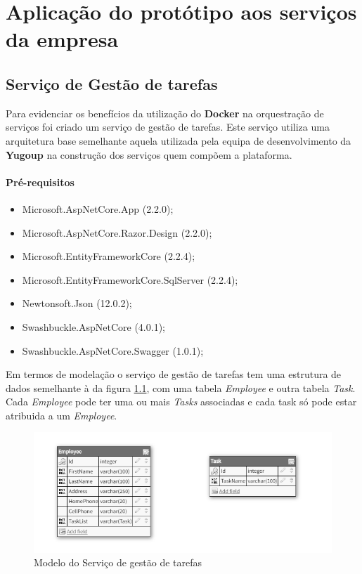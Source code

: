 \chapter[Aplicação do protótipo aos serviços da empresa]{Aplicação do protótipo aos serviços da empresa}
\label{Ch:ServicoExemplo}
\section{Serviço de Gestão de tarefas}

\hspace{1cm}Para evidenciar os benefícios da utilização do \textbf{Docker} na orquestração de serviços foi criado um serviço de gestão de tarefas. Este serviço utiliza uma arquitetura base semelhante aquela utilizada pela equipa de desenvolvimento da \textbf{Yugoup} na construção dos serviços quem compõem a plataforma.

\subsubsection{Pré-requisitos}

\begin{itemize}
 \item Microsoft.AspNetCore.App (2.2.0);
 \item Microsoft.AspNetCore.Razor.Design (2.2.0);
 \item Microsoft.EntityFrameworkCore (2.2.4);
 \item Microsoft.EntityFrameworkCore.SqlServer (2.2.4);
 \item Newtonsoft.Json (12.0.2);
 \item Swashbuckle.AspNetCore (4.0.1);
 \item Swashbuckle.AspNetCore.Swagger (1.0.1);
\end{itemize}

\hspace{1cm}Em termos de modelação o serviço de gestão de tarefas tem uma estrutura de dados semelhante à da figura \ref{Fig:Fig85}, com uma tabela \textit{Employee} e outra tabela \textit{Task}. Cada \textit{Employee} pode ter uma ou mais \textit{Tasks} associadas e cada task só pode estar atribuida a um \textit{Employee}.

\begin{figure}[hbt!]
\centering
\includegraphics[width=0.7\linewidth]{Cap7/TimeManagement.png}
\caption{Modelo do Serviço de gestão de tarefas}
\label{Fig:Fig85}
\end{figure}

